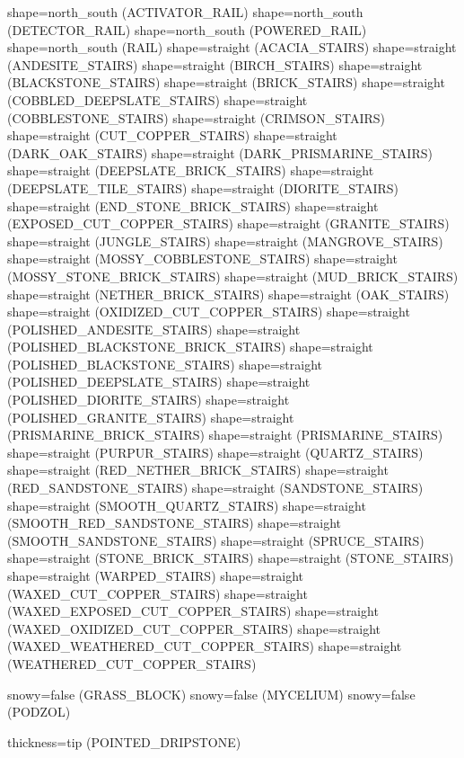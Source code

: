 \documentclass[11pt]{article}
\begin{document}
shape=north_south (ACTIVATOR_RAIL)
shape=north_south (DETECTOR_RAIL)
shape=north_south (POWERED_RAIL)
shape=north_south (RAIL)
shape=straight (ACACIA_STAIRS)
shape=straight (ANDESITE_STAIRS)
shape=straight (BIRCH_STAIRS)
shape=straight (BLACKSTONE_STAIRS)
shape=straight (BRICK_STAIRS)
shape=straight (COBBLED_DEEPSLATE_STAIRS)
shape=straight (COBBLESTONE_STAIRS)
shape=straight (CRIMSON_STAIRS)
shape=straight (CUT_COPPER_STAIRS)
shape=straight (DARK_OAK_STAIRS)
shape=straight (DARK_PRISMARINE_STAIRS)
shape=straight (DEEPSLATE_BRICK_STAIRS)
shape=straight (DEEPSLATE_TILE_STAIRS)
shape=straight (DIORITE_STAIRS)
shape=straight (END_STONE_BRICK_STAIRS)
shape=straight (EXPOSED_CUT_COPPER_STAIRS)
shape=straight (GRANITE_STAIRS)
shape=straight (JUNGLE_STAIRS)
shape=straight (MANGROVE_STAIRS)
shape=straight (MOSSY_COBBLESTONE_STAIRS)
shape=straight (MOSSY_STONE_BRICK_STAIRS)
shape=straight (MUD_BRICK_STAIRS)
shape=straight (NETHER_BRICK_STAIRS)
shape=straight (OAK_STAIRS)
shape=straight (OXIDIZED_CUT_COPPER_STAIRS)
shape=straight (POLISHED_ANDESITE_STAIRS)
shape=straight (POLISHED_BLACKSTONE_BRICK_STAIRS)
shape=straight (POLISHED_BLACKSTONE_STAIRS)
shape=straight (POLISHED_DEEPSLATE_STAIRS)
shape=straight (POLISHED_DIORITE_STAIRS)
shape=straight (POLISHED_GRANITE_STAIRS)
shape=straight (PRISMARINE_BRICK_STAIRS)
shape=straight (PRISMARINE_STAIRS)
shape=straight (PURPUR_STAIRS)
shape=straight (QUARTZ_STAIRS)
shape=straight (RED_NETHER_BRICK_STAIRS)
shape=straight (RED_SANDSTONE_STAIRS)
shape=straight (SANDSTONE_STAIRS)
shape=straight (SMOOTH_QUARTZ_STAIRS)
shape=straight (SMOOTH_RED_SANDSTONE_STAIRS)
shape=straight (SMOOTH_SANDSTONE_STAIRS)
shape=straight (SPRUCE_STAIRS)
shape=straight (STONE_BRICK_STAIRS)
shape=straight (STONE_STAIRS)
shape=straight (WARPED_STAIRS)
shape=straight (WAXED_CUT_COPPER_STAIRS)
shape=straight (WAXED_EXPOSED_CUT_COPPER_STAIRS)
shape=straight (WAXED_OXIDIZED_CUT_COPPER_STAIRS)
shape=straight (WAXED_WEATHERED_CUT_COPPER_STAIRS)
shape=straight (WEATHERED_CUT_COPPER_STAIRS)

snowy=false (GRASS_BLOCK)
snowy=false (MYCELIUM)
snowy=false (PODZOL)

thickness=tip (POINTED_DRIPSTONE)
\end{document}

